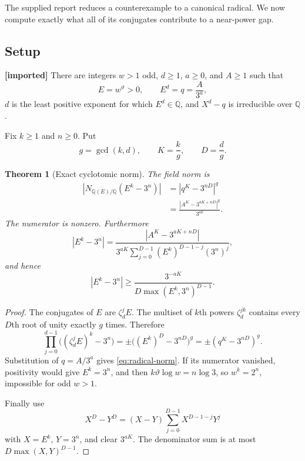 \documentclass[11pt,oneside]{article}
\newtheorem{theorem}{Theorem}[section]
\theoremstyle{definition}
\theoremstyle{remark}
\newcommand{\Q}{\mathbb Q}
\newcommand{\thetaq}{\vartheta}
\newcommand{\statusprior}{\textcolor{deepblue}{\textbf{[imported]}}}
\begin{document}
The supplied report reduces a counterexample to a canonical radical.  We now compute exactly
what all of its conjugates contribute to a near-power gap.

\subsection{Setup}

\statusprior{}  There are integers $w>1$ odd, $d\ge1$, $a\ge0$, and $A\ge1$ such that
\begin{equation}
 E=w^{\thetaq}>0,\qquad E^d=q=\frac{A}{3^a},
 \label{eq:E}
\end{equation}
$d$ is the least positive exponent for which $E^d\in\Q$, and
$X^d-q$ is irreducible over $\Q$.

Fix $k\ge1$ and $n\ge0$.  Put
\begin{equation}
 g=\gcd(k,d),\qquad K=\frac{k}{g},\qquad D=\frac{d}{g}.
 \label{eq:gKD}
\end{equation}

\begin{theorem}[Exact cyclotomic norm]
\label{thm:radical-norm}
The field norm is
\begin{align}
 \left|N_{\Q(E)/\Q}(E^k-3^n)\right|
 &=\left|q^K-3^{nD}\right|^g \\
 &=\frac{|A^K-3^{aK+nD}|^g}{3^{ak}}.
 \label{eq:radical-norm}
\end{align}
The numerator is nonzero.  Furthermore
\begin{equation}
 |E^k-3^n|
 =\frac{|A^K-3^{aK+nD}|}
 {3^{aK}\displaystyle\sum_{j=0}^{D-1}(E^k)^{D-1-j}(3^n)^j},
 \label{eq:radical-factor}
\end{equation}
and hence
\begin{equation}
 |E^k-3^n|
 \ge\frac{3^{-aK}}{D\max(E^k,3^n)^{D-1}}.
 \label{eq:radical-lower-elementary}
\end{equation}
\end{theorem}

\begin{proof}
The conjugates of $E$ are $\zeta_d^jE$.  The multiset of $k$th powers
$\zeta_d^{jk}$ contains every $D$th root of unity exactly $g$ times.  Therefore
\[
 \prod_{j=0}^{d-1}\bigl((\zeta_d^jE)^k-3^n\bigr)
 =\pm\bigl((E^k)^D-3^{nD}\bigr)^g
 =\pm(q^K-3^{nD})^g.
\]
Substitution of $q=A/3^a$ gives \eqref{eq:radical-norm}.  If its numerator vanished, positivity
would give $E^k=3^n$, and then
$k\thetaq\log w=n\log3$, so $w^k=2^n$, impossible for odd $w>1$.

Finally use
\[
 X^D-Y^D=(X-Y)\sum_{j=0}^{D-1}X^{D-1-j}Y^j
\]
with $X=E^k$, $Y=3^n$, and clear $3^{aK}$.  The denominator sum is at most
$D\max(X,Y)^{D-1}$.
\end{proof}
\end{document}

